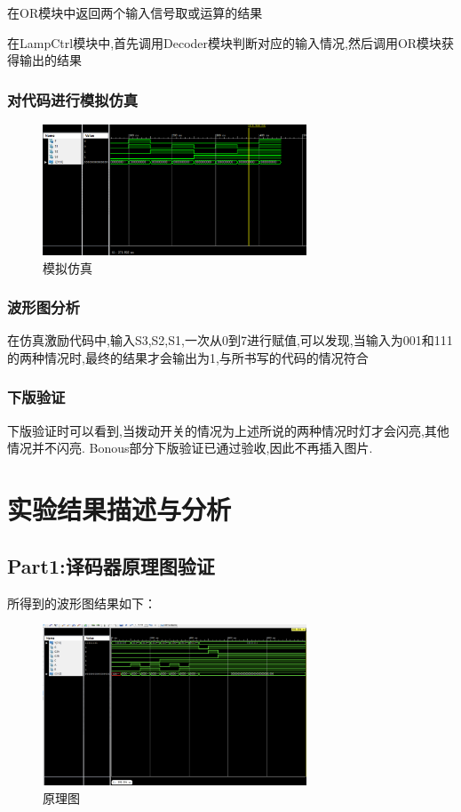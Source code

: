 \documentclass{article}
\begin{document}
在OR模块中返回两个输入信号取或运算的结果

在LampCtrl模块中,首先调用Decoder模块判断对应的输入情况,然后调用OR模块获得输出的结果

\subsubsection{对代码进行模拟仿真}
\begin{figure}[H]
	\centering
	\includegraphics[width=0.7\textwidth]{23.png}
	\caption{\label{Lab5}模拟仿真}
	\end{figure}
\subsubsection*{波形图分析}
在仿真激励代码中,输入{S3,S2,S1},一次从0到7进行赋值,可以发现,当输入为001和111的两种情况时,最终的结果才会输出为1,与所书写的代码的情况符合

\subsubsection*{下版验证}
下版验证时可以看到,当拨动开关的情况为上述所说的两种情况时灯才会闪亮,其他情况并不闪亮.
Bonous部分下版验证已通过验收,因此不再插入图片.

\section{实验结果描述与分析}

\subsection{Part1:译码器原理图验证}

所得到的波形图结果如下：
	\begin{figure}[H]
	\centering
	\includegraphics[width=0.7\textwidth]{10.png}
	\caption{\label{Lab5}原理图}
	\end{figure}
\end{document}
